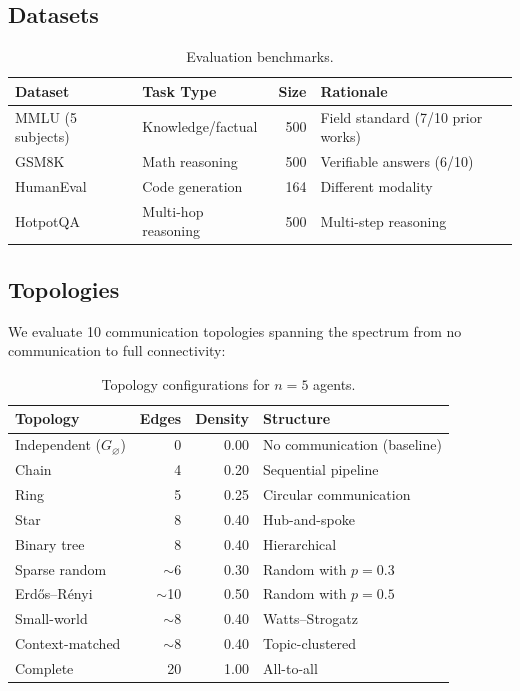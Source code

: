 \documentclass{article}
\begin{document}
\subsection{Datasets}

\begin{table}[h]
\centering
\caption{Evaluation benchmarks.}
\label{tab:datasets}
\begin{tabular}{@{}llrl@{}}
\toprule
Dataset & Task Type & Size & Rationale \\
\midrule
MMLU (5 subjects) & Knowledge/factual & 500 & Field standard (7/10 prior works) \\
GSM8K & Math reasoning & 500 & Verifiable answers (6/10) \\
HumanEval & Code generation & 164 & Different modality \\
HotpotQA & Multi-hop reasoning & 500 & Multi-step reasoning \\
\bottomrule
\end{tabular}
\end{table}

\subsection{Topologies}

We evaluate 10 communication topologies spanning the spectrum from no communication to full connectivity:

\begin{table}[h]
\centering
\caption{Topology configurations for $n=5$ agents.}
\label{tab:topologies}
\begin{tabular}{@{}lrrl@{}}
\toprule
Topology & Edges & Density & Structure \\
\midrule
Independent ($G_\varnothing$) & 0 & 0.00 & No communication (baseline) \\
Chain & 4 & 0.20 & Sequential pipeline \\
Ring & 5 & 0.25 & Circular communication \\
Star & 8 & 0.40 & Hub-and-spoke \\
Binary tree & 8 & 0.40 & Hierarchical \\
Sparse random & $\sim$6 & 0.30 & Random with $p=0.3$ \\
Erd\H{o}s--R\'{e}nyi & $\sim$10 & 0.50 & Random with $p=0.5$ \\
Small-world & $\sim$8 & 0.40 & Watts--Strogatz \\
Context-matched & $\sim$8 & 0.40 & Topic-clustered \\
Complete & 20 & 1.00 & All-to-all \\
\bottomrule
\end{tabular}
\end{table}
\end{document}
